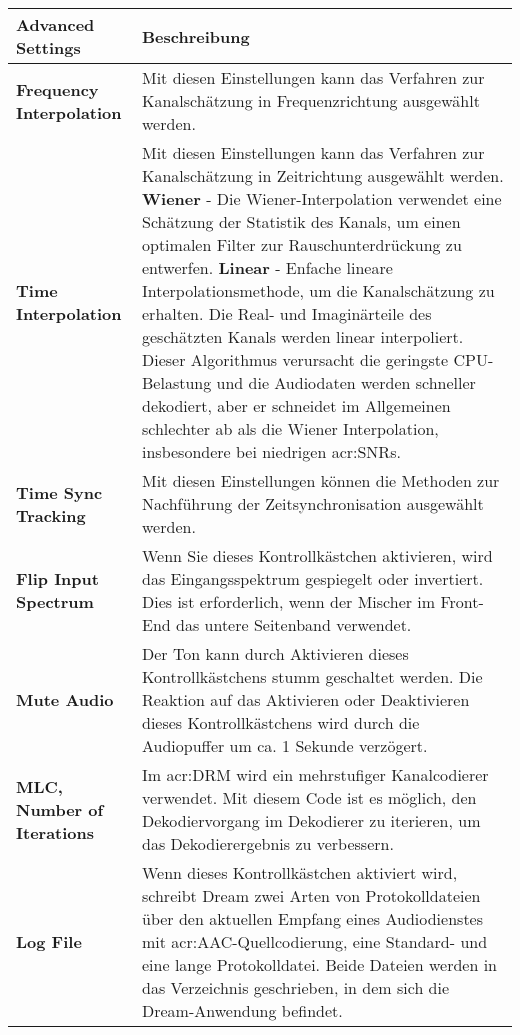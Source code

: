 \begin{table}[htb]
	\begin{center}
		\begin{tabular}{|p{0.25\linewidth} | p{0.75\linewidth}|}	
			\toprule
			\textbf{Advanced Settings} & \textbf{Beschreibung}\\
			\midrule
			\textbf{Frequency Interpolation} & Mit diesen Einstellungen kann das Verfahren zur Kanalschätzung in Frequenzrichtung ausgewählt werden.\\
			\midrule
			\textbf{Time Interpolation} & Mit diesen Einstellungen kann das Verfahren zur Kanalschätzung in Zeitrichtung ausgewählt werden.\newline
			\textbf{Wiener} - Die Wiener-Interpolation verwendet eine Schätzung der Statistik des Kanals, um einen optimalen Filter zur Rauschunterdrückung zu entwerfen.\newline
			\textbf{Linear} - Enfache lineare Interpolationsmethode, um die Kanalschätzung zu erhalten. Die Real- und Imaginärteile des geschätzten Kanals werden linear interpoliert. Dieser Algorithmus verursacht die geringste CPU-Belastung und die Audiodaten werden schneller dekodiert, aber er schneidet im Allgemeinen schlechter ab als die Wiener Interpolation, insbesondere bei niedrigen \gls{acr:SNR}s.\\
			\midrule
			\textbf{Time Sync Tracking} & 	Mit diesen Einstellungen können die Methoden zur Nachführung der Zeitsynchronisation ausgewählt werden. \\
			\midrule
			\textbf{Flip Input Spectrum} & Wenn Sie dieses Kontrollkästchen aktivieren, wird das Eingangsspektrum gespiegelt oder invertiert. Dies ist erforderlich, wenn der Mischer im Front-End das untere Seitenband verwendet.
			\\
			\midrule
			\textbf{Mute Audio} & Der Ton kann durch Aktivieren dieses Kontrollkästchens stumm geschaltet werden. Die Reaktion auf das Aktivieren oder Deaktivieren dieses Kontrollkästchens wird durch die Audiopuffer um ca. 1 Sekunde verzögert.
			\\
			\midrule
			\textbf{MLC, Number of Iterations} & Im \gls{acr:DRM} wird ein  mehrstufiger Kanalcodierer verwendet. Mit diesem Code ist es möglich, den Dekodiervorgang im Dekodierer zu iterieren, um das Dekodierergebnis zu verbessern. \\
			\midrule
			\textbf{Log File} & Wenn dieses Kontrollkästchen aktiviert wird, schreibt Dream zwei Arten von Protokolldateien über den aktuellen Empfang eines Audiodienstes mit \gls{acr:AAC}-Quellcodierung, eine Standard- und eine lange Protokolldatei. Beide Dateien werden in das Verzeichnis geschrieben, in dem sich die Dream-Anwendung befindet.\\

\end{tabular}
\end{center}
\end{table}
